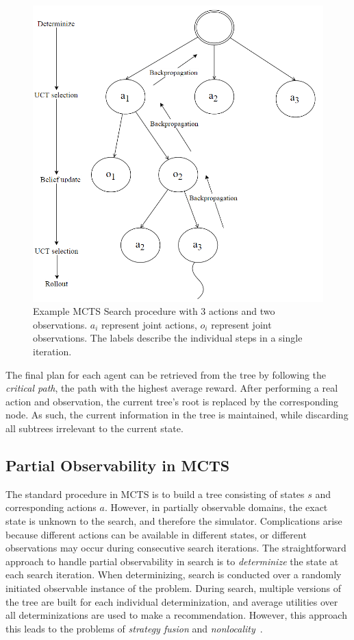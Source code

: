 \documentclass[conference]{IEEEtran}
\begin{document}
\begin{figure}
\begin{center}
 \includegraphics[width=.44\textwidth]{img/searchtree.png}
 \caption{Example MCTS Search procedure with 3 actions and two observations. $a_i$ represent joint actions, $o_i$ represent joint observations. The labels describe the individual steps in a single iteration.}\label{fig:searchtree}
\end{center}
\end{figure}

The final plan for each agent can be retrieved from the tree by following the \emph{critical path}, \ie the path with the highest average reward. After performing a real action and observation, the current tree's root is replaced by the corresponding node. As such, the current information in the tree is maintained, while discarding all subtrees irrelevant to the current state.

\subsection{Partial Observability in MCTS}
\label{sub:pomcts}

The standard procedure in MCTS is to build a tree consisting of states $s$ and corresponding actions $a$. However, in partially observable domains, the exact state is unknown to the search, and therefore the simulator. Complications arise because different actions can be available in different states, or different observations may occur during consecutive search iterations. The straightforward approach to handle partial observability in search is to \emph{determinize} the state at each search iteration. When determinizing, search is conducted over a randomly initiated observable instance of the problem. During search, multiple versions of the tree are built for each individual determinization, and average utilities over all determinizations are used to make a recommendation. However, this approach this leads to the problems of \emph{strategy fusion} and \emph{nonlocality}~\cite{cowling2012information}.
\end{document}
